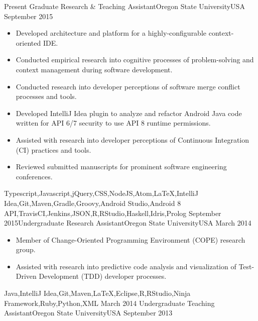 \documentclass[localFont,alternative]{yaac-another-awesome-cv}
\begin{document}
\begin{experiences}
  \experience
    {Present}       {Graduate Research \& Teaching Assistant}{Oregon State University}{USA}
    {September 2015}{
                      \begin{itemize}
                        \item Developed architecture and platform for a highly-configurable context-oriented IDE.
                        \item Conducted empirical research into cognitive processes of problem-solving and context management during software development.
                        \item Conducted research into developer perceptions of software merge conflict processes and tools.
                        \item Developed IntelliJ Idea plugin to analyze and refactor Android Java code written for API 6/7 security to use API 8 runtime permissions.
                        \item Assisted with research into developer perceptions of Continuous Integration (CI) practices and tools. 
                        \item Reviewed submitted manuscripts for prominent software engineering conferences.                                        
                      \end{itemize}
                    }
    {Typescript,Javascript,jQuery,CSS,NodeJS,Atom,LaTeX,IntelliJ Idea,Git,Maven,Gradle,Groovy,Android Studio,Android 8 API,TravisCI,Jenkins,JSON,R,RStudio,Haskell,Idris,Prolog}
  \emptySeparator
  \experience
    {September 2015}{Undergraduate Research Assistant}{Oregon State University}{USA}
    {March 2014}    {
                      \begin{itemize}
                        \item Member of Change-Oriented Programming Environment (COPE) research group.                       
                        \item Assisted with research into predictive code analysis and visualization of Test-Driven Development (TDD) developer processes.    
                      \end{itemize}
                    }
    {Java,IntelliJ Idea,Git,Maven,LaTeX,Eclipse,R,RStudio,Ninja Framework,Ruby,Python,XML}
  \emptySeparator
  \experience
    {March 2014}    {Undergraduate Teaching Assistant}{Oregon State University}{USA}
    {September 2013}{
                      \begin{itemize}

\end{itemize}}
\end{experiences}
\end{document}
